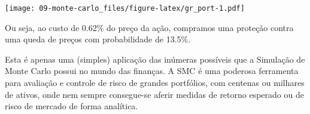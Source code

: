 \documentclass[]{book}
\newenvironment{Shaded}{\begin{snugshade}}{\end{snugshade}}
\newcommand{\DataTypeTok}[1]{\textcolor[rgb]{0.13,0.29,0.53}{#1}}
\newcommand{\DecValTok}[1]{\textcolor[rgb]{0.00,0.00,0.81}{#1}}
\newcommand{\KeywordTok}[1]{\textcolor[rgb]{0.13,0.29,0.53}{\textbf{#1}}}
\newcommand{\NormalTok}[1]{#1}
\newcommand{\OperatorTok}[1]{\textcolor[rgb]{0.81,0.36,0.00}{\textbf{#1}}}
\newcommand{\OtherTok}[1]{\textcolor[rgb]{0.56,0.35,0.01}{#1}}
\newcommand{\StringTok}[1]{\textcolor[rgb]{0.31,0.60,0.02}{#1}}
\theoremstyle{definition}
\theoremstyle{definition}
\theoremstyle{definition}
\theoremstyle{remark}
\begin{document}
\begin{Shaded}
\end{Shaded}

\texttt{[image: 09-monte-carlo\_files/figure-latex/gr\_port-1.pdf]}

Ou seja, ao custo de 0.62\% do preço da ação, compramos uma proteção contra uma queda de preços com probabilidade de 13.5\%.

Esta é apenas uma (simples) aplicação das inúmeras possíveis que a Simulação de Monte Carlo possui no mundo das finanças. A SMC é uma poderosa ferramenta para avaliação e controle de risco de grandes portfólios, com centenas ou milhares de ativos, onde nem sempre consegue-se aferir medidas de retorno esperado ou de risco de mercado de forma analítica.
\end{document}
